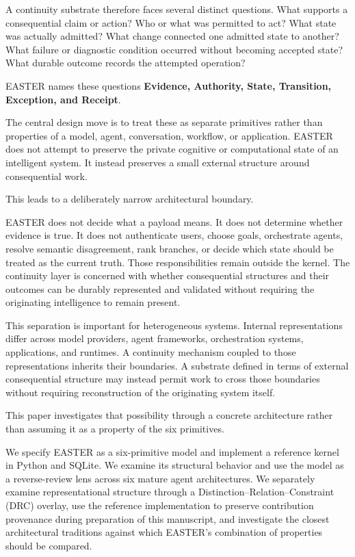 \documentclass[11pt]{article}
\begin{document}
A continuity substrate therefore faces several distinct questions. What supports a consequential claim or action? Who or what was permitted to act? What state was actually admitted? What change connected one admitted state to another? What failure or diagnostic condition occurred without becoming accepted state? What durable outcome records the attempted operation?

EASTER names these questions \textbf{Evidence, Authority, State, Transition, Exception, and Receipt}.

The central design move is to treat these as separate primitives rather than properties of a model, agent, conversation, workflow, or application. EASTER does not attempt to preserve the private cognitive or computational state of an intelligent system. It instead preserves a small external structure around consequential work.

This leads to a deliberately narrow architectural boundary.

EASTER does not decide what a payload means. It does not determine whether evidence is true. It does not authenticate users, choose goals, orchestrate agents, resolve semantic disagreement, rank branches, or decide which state should be treated as the current truth. Those responsibilities remain outside the kernel. The continuity layer is concerned with whether consequential structures and their outcomes can be durably represented and validated without requiring the originating intelligence to remain present.

This separation is important for heterogeneous systems. Internal representations differ across model providers, agent frameworks, orchestration systems, applications, and runtimes. A continuity mechanism coupled to those representations inherits their boundaries. A substrate defined in terms of external consequential structure may instead permit work to cross those boundaries without requiring reconstruction of the originating system itself.

This paper investigates that possibility through a concrete architecture rather than assuming it as a property of the six primitives.

We specify EASTER as a six-primitive model and implement a reference kernel in Python and SQLite. We examine its structural behavior and use the model as a reverse-review lens across six mature agent architectures. We separately examine representational structure through a Distinction--Relation--Constraint (DRC) overlay, use the reference implementation to preserve contribution provenance during preparation of this manuscript, and investigate the closest architectural traditions against which EASTER's combination of properties should be compared.
\end{document}
